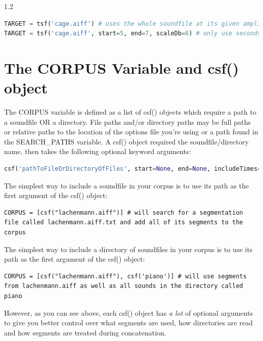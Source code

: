\documentclass{article}
\begin{document}
\begin{spacing}{1.2}
\begin{lstlisting}[language=python]
TARGET = tsf('cage.aiff') # uses the whole soundfile at its given amplitude
TARGET = tsf('cage.aiff', start=5, end=7, scaleDb=6) # only use seconds 5-7 of cage.aiff at double the amplitude.
\end{lstlisting}


\section{The CORPUS Variable and csf() object}
The CORPUS variable is defined as a list of csf() objects which require a path to a soundfile OR a directory.  File paths and/or directory paths may be full paths or relative paths to the location of the options file you're using or a path found in the SEARCH\_PATHS variable.  A csf() object required the soundfile/directory name, then takes the following optional keyword arguments:

\begin{lstlisting}[language=python]
csf('pathToFileOrDirectoryOfFiles', start=None, end=None, includeTimes=[], excludeTimes=[], limit=[], wholeFile=False, recursive=True, includeStr=None, excludeStr=None, scaleDb=0.0, limitDur=None, onsetLen=0.01, offsetLen='30%', postSelectAmpBool=False, postSelectAmpMethod='power-mean-seg', postSelectAmpMin=-12, postSelectAmpMax=+12, midiPitchMethod='composite', transMethod=None,  transQuantize=0, allowRepetition=True, restrictRepetition=0.5, restrictOverlaps=None, restrictInTime=0, scaleDistance=1, superimposeRule=None, segmentationFile=None, segmentationExtension='.txt')
\end{lstlisting}

The simplest way to include a soundfile in your corpus is to use its path as the first argument of the csf() object:
\begin{lstlisting}
CORPUS = [csf("lachenmann.aiff")] # will search for a segmentation file called lachenmann.aiff.txt and add all of its segments to the corpus
\end{lstlisting}

The simplest way to include a directory of soundfiles in your corpus is to use its path as the first argument of the csf() object:
\begin{lstlisting}
CORPUS = [csf("lachenmann.aiff"), csf('piano')] # will use segments from lachenmann.aiff as well as all sounds in the directory called piano
\end{lstlisting}

\noindent However, as you can see above, each csf() object has \emph{a lot} of optional arguments to give you better control over what segments are used, how directories are read and how segments are treated during concatenation.  


\end{spacing}
\end{document}
